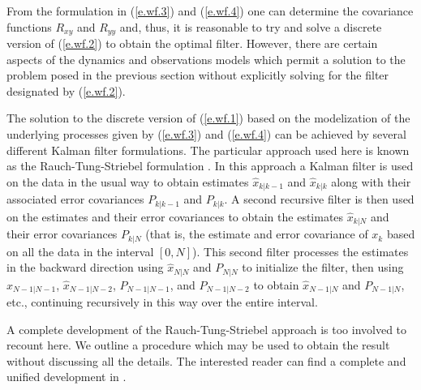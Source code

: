 	From the formulation in (\ref{e.wf.3}) and (\ref{e.wf.4})
one can determine the covariance functions $R_{xy}$ and $R_{yy}$
and, thus, it is reasonable to try and solve a discrete version of
(\ref{e.wf.2}) to obtain the optimal filter.
However, there are certain aspects of the 
dynamics and observations models which permit
a solution to the problem posed in the previous
section without explicitly solving for
the filter designated by (\ref{e.wf.2}).

	The solution to the discrete version of (\ref{e.wf.1})
based on the modelization of the underlying processes
given by (\ref{e.wf.3}) and (\ref{e.wf.4}) can be achieved by
several different Kalman filter formulations.  The particular
approach used here is known as the Rauch-Tung-Striebel
formulation \cite{Gelb}.
In this approach a Kalman filter is
used on the data in the usual way to obtain
estimates $\hat{x}_{k|k-1}$ and $\hat{x}_{k|k}$ along with their associated
error covariances $P_{k|k-1}$ and $P_{k|k}$.  A second recursive
filter is then used on the estimates and their error
covariances to obtain the estimates $\hat{x}_{k|N}$ and their
error covariances $P_{k|N}$ (that is, the estimate and error covariance
of $x_k$ based on all the data in the interval $[0,N]$).  This second
filter processes the estimates in the backward direction using
$\hat{x}_{N|N}$ and $P_{N|N}$ to initialize the filter,
then using $\hat{x}_{N-1|N-1}$, $\hat{x}_{N-1|N-2}$, $P_{N-1|N-1}$, and
$P_{N-1|N-2}$ to obtain $\hat{x}_{N-1|N}$ and $P_{N-1|N}$, etc.,
continuing recursively in this way over the entire interval.

	A complete development of the Rauch-Tung-Striebel
approach is too involved
to recount here.  We outline a procedure which may be used
to obtain the result without discussing all the
details.  The interested reader can find a complete and
unified development in \cite{Nikoukhah}.


